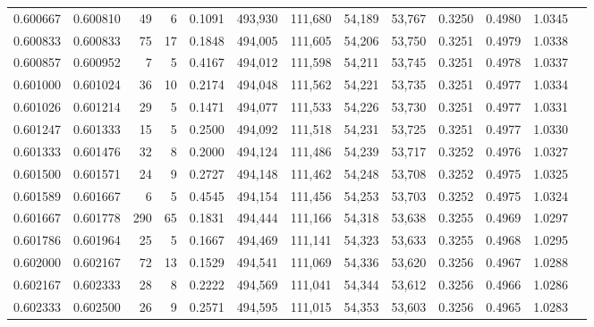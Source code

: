 \begin{tabular}{rrrrrrrrrrrrr}
0.600667 & 0.600810 &    49 &   6 &                                     0.1091 & 493,930 & 111,680 &  54,189 &  53,767 & 0.3250 & 0.4980 & 1.0345 \\
0.600833 & 0.600833 &    75 &  17 &                                     0.1848 & 494,005 & 111,605 &  54,206 &  53,750 & 0.3251 & 0.4979 & 1.0338 \\
0.600857 & 0.600952 &     7 &   5 &                                     0.4167 & 494,012 & 111,598 &  54,211 &  53,745 & 0.3251 & 0.4978 & 1.0337 \\
0.601000 & 0.601024 &    36 &  10 &                                     0.2174 & 494,048 & 111,562 &  54,221 &  53,735 & 0.3251 & 0.4977 & 1.0334 \\
0.601026 & 0.601214 &    29 &   5 &                                     0.1471 & 494,077 & 111,533 &  54,226 &  53,730 & 0.3251 & 0.4977 & 1.0331 \\
0.601247 & 0.601333 &    15 &   5 &                                     0.2500 & 494,092 & 111,518 &  54,231 &  53,725 & 0.3251 & 0.4977 & 1.0330 \\
0.601333 & 0.601476 &    32 &   8 &                                     0.2000 & 494,124 & 111,486 &  54,239 &  53,717 & 0.3252 & 0.4976 & 1.0327 \\
0.601500 & 0.601571 &    24 &   9 &                                     0.2727 & 494,148 & 111,462 &  54,248 &  53,708 & 0.3252 & 0.4975 & 1.0325 \\
0.601589 & 0.601667 &     6 &   5 &                                     0.4545 & 494,154 & 111,456 &  54,253 &  53,703 & 0.3252 & 0.4975 & 1.0324 \\
0.601667 & 0.601778 &   290 &  65 &                                     0.1831 & 494,444 & 111,166 &  54,318 &  53,638 & 0.3255 & 0.4969 & 1.0297 \\
0.601786 & 0.601964 &    25 &   5 &                                     0.1667 & 494,469 & 111,141 &  54,323 &  53,633 & 0.3255 & 0.4968 & 1.0295 \\
0.602000 & 0.602167 &    72 &  13 &                                     0.1529 & 494,541 & 111,069 &  54,336 &  53,620 & 0.3256 & 0.4967 & 1.0288 \\
0.602167 & 0.602333 &    28 &   8 &                                     0.2222 & 494,569 & 111,041 &  54,344 &  53,612 & 0.3256 & 0.4966 & 1.0286 \\
0.602333 & 0.602500 &    26 &   9 &                                     0.2571 & 494,595 & 111,015 &  54,353 &  53,603 & 0.3256 & 0.4965 & 1.0283 \\

\end{tabular}
